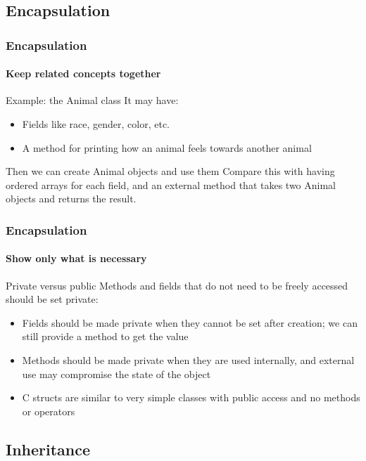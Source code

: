 \subsection{Encapsulation}

\begin{frame}
\frametitle{Encapsulation}
\framesubtitle{Keep related concepts together}

\begin{block}{Example: the Animal class}
It may have:
\begin{itemize}
\item Fields like race, gender, color, etc.
\item A method for printing how an animal feels towards another animal
\end{itemize}
\end{block}
\pause
\begin{block}{Then we can create Animal objects and use them}
Compare this with having ordered arrays for each field, and an external method that takes two Animal objects and returns the result.
\end{block}

\end{frame}

\begin{frame}
\frametitle{Encapsulation}
\framesubtitle{Show only what is necessary}

\begin{block}{Private versus public}
Methods and fields that do not need to be freely accessed should be set private:
\begin{itemize}
\item Fields should be made private when they cannot be set after creation; we can still provide a method to get the value
\item Methods should be made private when they are used internally, and external use may compromise the state of the object
\end{itemize}
\end{block}
\pause
\begin{itemize}
\item C structs are similar to very simple classes with public access and no methods or operators
\end{itemize}

\end{frame}

\subsection{Inheritance}

